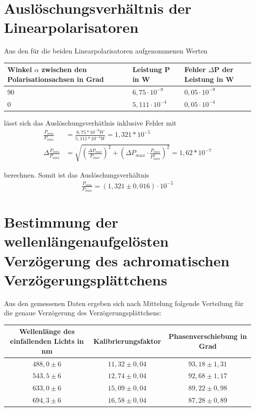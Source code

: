 \documentclass[bigchapter,colorback,accentcolor=tud4b,linedtoc,11pt]{tudreport}
\begin{document}
\section{Auslöschungsverhältnis der Linearpolarisatoren}
Aus den für die beiden Linearpolarisatoren aufgenommenen Werten
\begin{center}
  \begin{tabular}{|p{5cm}|p{4cm}|p{4.5cm}|}
    \hline
        Winkel $\alpha$ zwischen den Polarisationsachsen in Grad & Leistung P in W & Fehler $\Delta$P der Leistung in W \\ \hline
        90 & $6,75 \cdot 10^{-9}$ & $0,05 \cdot 10^{-9}$ \\ \hline
        0 & $5,111 \cdot 10^{-4}$ & $0,05 \cdot 10^{-4}$ \\ \hline
	\end{tabular}
\end{center}

lässt sich das Auslöschungsverhätlnis inklusive Fehler mit
\begin{align*}
  \frac{P_{min}}{P_{max}} &= \frac{6,75*10^{-9} W}{5,111*10^{-4} W} = 1,321*10^{-5} \\
  \Delta\frac{P_{min}}{P_{max}} &= \sqrt{\left(\frac{\Delta P_{min}}{P_{max}}\right)^2 + \left(\Delta P_{max} \cdot \frac{P_{min}}{P_{max}^2}\right)^2} = 1,62 * 10^{-7}
\end{align*}

berechnen. Somit ist das Auslöschungsverhältnis
\begin{align*}
\frac{P_{min}}{P_{max}} =\left(1,321\pm0,016\right) \cdot 10^{-5}
\end{align*}
\section{Bestimmung der wellenlängenaufgelösten Verzögerung des achromatischen Verzögerungsplättchens}

Aus den gemessenen Daten ergeben sich nach Mittelung folgende Verteilung für die genaue Verzögerung des Verzögerungsplättchens:
\begin{center}
  \begin{tabular}{|c|c|c|}
    \hline
        Wellenlänge des einfallenden Lichts in nm & Kalibrierungsfaktor & Phasenverschiebung in Grad \\ \hline
        $488,0 \pm 6$                             & $11,32 \pm 0,04$              & $93,18 \pm 1,31$           \\ \hline
        $543,5 \pm 6$                             & $12,74 \pm 0,04$              & $92,68 \pm 1,17$           \\ \hline
        $633,0 \pm 6$                             & $15,09 \pm 0,04$              & $89,22 \pm 0,98$           \\ \hline
        $694,3 \pm 6$                             & $16,58 \pm 0,04$              & $87,28 \pm 0,89$           \\ \hline
	\end{tabular}
\end{center}
\end{document}
